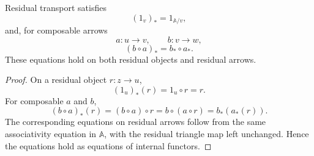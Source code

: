 \begin{proposition}
\label{prop:residual-transport-laws}
    Residual transport satisfies
    \[
        (1_v)_*
        =
        1_{\mathbb A/v},
    \]
    and, for composable arrows
    \[
        a:u\to v,
        \qquad
        b:v\to w,
    \]
    \[
        (b\circ a)_*
        =
        b_*\circ a_*.
    \]
    These equations hold on both residual objects and residual arrows.
\end{proposition}
\begin{proof}
    On a residual object \(r:z\to u\),
    \[
        (1_u)_*(r)
        =
        1_u\circ r
        =
        r.
    \]
    For composable \(a\) and \(b\),
    \[
        (b\circ a)_*(r)
        =
        (b\circ a)\circ r
        =
        b\circ(a\circ r)
        =
        b_*(a_*(r)).
    \]
    The corresponding equations on residual arrows follow from the same
    associativity equation in \(\mathbb A\), with the residual triangle map
    left unchanged. Hence the equations hold as equations of internal
    functors.
\end{proof}

